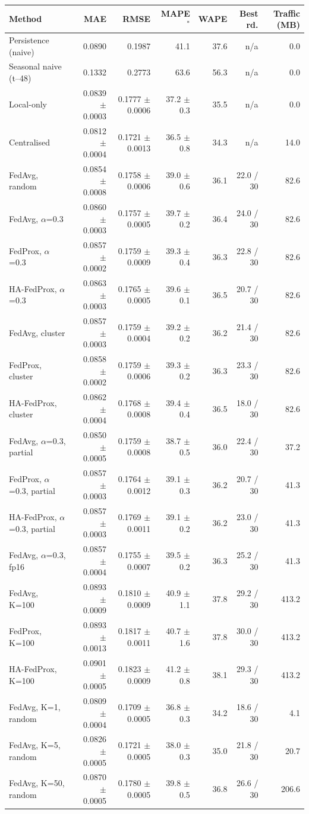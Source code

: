 \begin{tabular}{lrrrrrr}
\toprule
Method & MAE & RMSE & MAPE$^\ast$ & WAPE & Best rd. & Traffic (MB) \\
\midrule
Persistence (naive) & 0.0890 & 0.1987 & 41.1 & 37.6 & n/a & 0.0 \\
Seasonal naive (t--48) & 0.1332 & 0.2773 & 63.6 & 56.3 & n/a & 0.0 \\
Local-only & 0.0839 $\pm$ 0.0003 & 0.1777 $\pm$ 0.0006 & 37.2 $\pm$ 0.3 & 35.5 & n/a & 0.0 \\
Centralised & 0.0812 $\pm$ 0.0004 & 0.1721 $\pm$ 0.0013 & 36.5 $\pm$ 0.8 & 34.3 & n/a & 14.0 \\
FedAvg, random & 0.0854 $\pm$ 0.0008 & 0.1758 $\pm$ 0.0006 & 39.0 $\pm$ 0.6 & 36.1 & 22.0 / 30 & 82.6 \\
FedAvg, $\alpha$=0.3 & 0.0860 $\pm$ 0.0003 & 0.1757 $\pm$ 0.0005 & 39.7 $\pm$ 0.2 & 36.4 & 24.0 / 30 & 82.6 \\
FedProx, $\alpha$=0.3 & 0.0857 $\pm$ 0.0002 & 0.1759 $\pm$ 0.0009 & 39.3 $\pm$ 0.4 & 36.3 & 22.8 / 30 & 82.6 \\
HA-FedProx, $\alpha$=0.3 & 0.0863 $\pm$ 0.0003 & 0.1765 $\pm$ 0.0005 & 39.6 $\pm$ 0.1 & 36.5 & 20.7 / 30 & 82.6 \\
FedAvg, cluster & 0.0857 $\pm$ 0.0003 & 0.1759 $\pm$ 0.0004 & 39.2 $\pm$ 0.2 & 36.2 & 21.4 / 30 & 82.6 \\
FedProx, cluster & 0.0858 $\pm$ 0.0002 & 0.1759 $\pm$ 0.0006 & 39.3 $\pm$ 0.2 & 36.3 & 23.3 / 30 & 82.6 \\
HA-FedProx, cluster & 0.0862 $\pm$ 0.0004 & 0.1768 $\pm$ 0.0008 & 39.4 $\pm$ 0.4 & 36.5 & 18.0 / 30 & 82.6 \\
FedAvg, $\alpha$=0.3, partial & 0.0850 $\pm$ 0.0005 & 0.1759 $\pm$ 0.0008 & 38.7 $\pm$ 0.5 & 36.0 & 22.4 / 30 & 37.2 \\
FedProx, $\alpha$=0.3, partial & 0.0857 $\pm$ 0.0003 & 0.1764 $\pm$ 0.0012 & 39.1 $\pm$ 0.3 & 36.2 & 20.7 / 30 & 41.3 \\
HA-FedProx, $\alpha$=0.3, partial & 0.0857 $\pm$ 0.0003 & 0.1769 $\pm$ 0.0011 & 39.1 $\pm$ 0.2 & 36.2 & 23.0 / 30 & 41.3 \\
FedAvg, $\alpha$=0.3, fp16 & 0.0857 $\pm$ 0.0004 & 0.1755 $\pm$ 0.0007 & 39.5 $\pm$ 0.2 & 36.3 & 25.2 / 30 & 41.3 \\
FedAvg, K=100 & 0.0893 $\pm$ 0.0009 & 0.1810 $\pm$ 0.0009 & 40.9 $\pm$ 1.1 & 37.8 & 29.2 / 30 & 413.2 \\
FedProx, K=100 & 0.0893 $\pm$ 0.0013 & 0.1817 $\pm$ 0.0011 & 40.7 $\pm$ 1.6 & 37.8 & 30.0 / 30 & 413.2 \\
HA-FedProx, K=100 & 0.0901 $\pm$ 0.0005 & 0.1823 $\pm$ 0.0009 & 41.2 $\pm$ 0.8 & 38.1 & 29.3 / 30 & 413.2 \\
FedAvg, K=1, random & 0.0809 $\pm$ 0.0004 & 0.1709 $\pm$ 0.0005 & 36.8 $\pm$ 0.3 & 34.2 & 18.6 / 30 & 4.1 \\
FedAvg, K=5, random & 0.0826 $\pm$ 0.0005 & 0.1721 $\pm$ 0.0005 & 38.0 $\pm$ 0.3 & 35.0 & 21.8 / 30 & 20.7 \\
FedAvg, K=50, random & 0.0870 $\pm$ 0.0005 & 0.1780 $\pm$ 0.0005 & 39.8 $\pm$ 0.5 & 36.8 & 26.6 / 30 & 206.6 \\
\bottomrule
\end{tabular}
